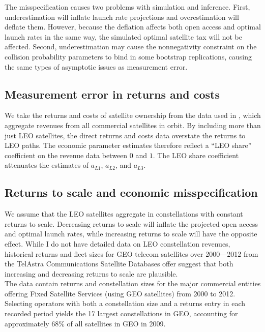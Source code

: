 \documentclass[12pt]{article}
\begin{document}
The misspecification causes two problems with simulation and inference. First, underestimation will inflate launch rate projections and overestimation will deflate them. However, because the deflation affects both open access and optimal launch rates in the same way, the simulated optimal satellite tax will not be affected. Second, underestimation may cause the nonnegativity constraint on the collision probability parameters to bind in some bootstrap replications, causing the same types of asymptotic issues as measurement error.

\subsection{Measurement error in returns and costs}
\label{attenuationFactors}

We take the returns and costs of satellite ownership from the data used in \citet{wienzierl2018}, which aggregate revenues from all commercial satellites in orbit. By including more than just LEO satellites, the direct returns and costs data overstate the returns to LEO paths. The economic parameter estimates therefore reflect a ``LEO share'' coefficient on the revenue data between $0$ and $1$. The LEO share coefficient attenuates the estimates of $a_{L 1}$, $a_{L 2}$, and $a_{L 3}$.

\subsection{Returns to scale and economic misspecification}

We assume that the LEO satellites aggregate in constellations with constant returns to scale. Decreasing returns to scale will inflate the projected open access and optimal launch rates, while increasing returns to scale will have the opposite effect. While I do not have detailed data on LEO constellation revenues, historical returns and fleet sizes for GEO telecom satellites over 2000---2012 from the TelAstra Communications Satellite Databases \citep{ta17data} offer suggest that both increasing and decreasing returns to scale are plausible. \\

The data contain returns and constellation sizes for the major commercial entities offering Fixed Satellite Services (using GEO satellites) from 2000 to 2012. Selecting operators with both a constellation size and a returns entry in each recorded period yields the 17 largest constellations in GEO, accounting for approximately 68\% of all satellites in GEO in 2009. 
\end{document}
